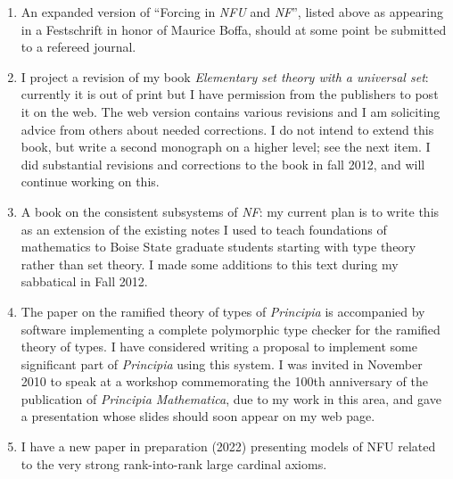 \begin{description}
\begin{enumerate}
\item An expanded version of ``Forcing in {\em NFU\/} and {\em
NF\/}'', listed above as appearing in a Festschrift in honor of
Maurice Boffa, should at some point be submitted to a refereed
journal.

\item I project a revision of my book {\em Elementary set theory with
a universal set\/}: currently it is out of print but I have permission
from the publishers to post it on the web.  The web version contains
various revisions and I am soliciting advice from others about needed
corrections.  I do not intend to extend this book, but write a second
monograph on a higher level; see the next item.  I did substantial revisions and corrections to the book in fall 2012, and will continue working on this.

\item A book on the consistent subsystems of {\em NF\/}: my current
plan is to write this as an extension of the existing notes I used to
teach foundations of mathematics to Boise State graduate students
starting with type theory rather than set theory.  I made some additions to this text during my sabbatical in Fall 2012.

\item The paper on the ramified theory of types of {\em Principia\/}
is accompanied by software implementing a complete polymorphic type
checker for the ramified theory of types.  I have considered writing a
proposal to implement some significant part of {\em Principia\/} using
this system.  I was invited in November 2010 to speak at a workshop
commemorating the 100th anniversary of the publication of {\em
Principia Mathematica\/}, due to my work in this area, and gave a
presentation whose slides should soon appear on my web page.

\item I have a new paper in preparation (2022) presenting models of NFU related to the very strong rank-into-rank large cardinal axioms.

\end{enumerate}

\end{description}





















